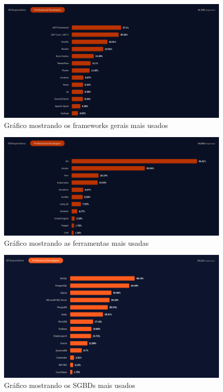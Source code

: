 \documentclass[12pt]{article}
\begin{document}
\begin{figure}[H]
  \centering
  \includegraphics[width=1\textwidth]{general_framework_usage.png}
  \caption{Gráfico mostrando os frameworks gerais mais usados}\label{fig:general-frameworks}
\end{figure}

\begin{figure}[H]
  \centering
  \includegraphics[width=1\textwidth]{used_tools.png}
  \caption{Gráfico mostrando as ferramentas mais usadas}\label{fig:tools}
\end{figure}

\begin{figure}[H]
  \centering
  \includegraphics[width=1\textwidth]{databases.png}
  \caption{Gráfico mostrando os SGBDs mais usados}\label{fig:databases}
\end{figure}
\end{document}
